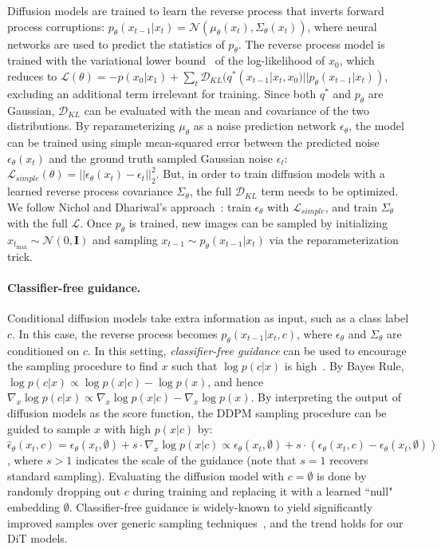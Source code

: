 \documentclass[10pt,twocolumn,letterpaper]{article}
\begin{document}
Diffusion models are trained to learn the reverse process that inverts forward process corruptions: $p_\theta(x_{t-1}|x_t) = \mathcal{N}(\mu_\theta(x_t), \Sigma_\theta(x_t))$, where neural networks are used to predict the statistics of $p_\theta$. The reverse process model is trained with the variational lower bound~\cite{kingma2013auto} of the log-likelihood of $x_0$, which reduces to $\mathcal{L}(\theta) = -p(x_0|x_1) + \sum_t \mathcal{D}_{KL}(q^*(x_{t-1}|x_{t},x_0)||p_\theta(x_{t-1}|x_t))$, excluding an additional term irrelevant for training. Since both $q^*$ and $p_\theta$ are Gaussian, $\mathcal{D}_{KL}$ can be evaluated with the mean and covariance of the two distributions. By reparameterizing $\mu_\theta$ as a noise prediction network $\epsilon_\theta$, the model can be trained using simple mean-squared error between the predicted noise $\epsilon_\theta(x_t)$ and the ground truth sampled Gaussian noise $\epsilon_t$: $\mathcal{L}_{simple}(\theta) = ||\epsilon_\theta(x_t) - \epsilon_t||_2^2$. But, in order to train diffusion models with a learned reverse process covariance $\Sigma_\theta$, the full $\mathcal{D}_{KL}$ term needs to be optimized. We follow Nichol and Dhariwal's approach~\cite{nichol2021improved}: train $\epsilon_\theta$ with $\mathcal{L}_{simple}$, and train $\Sigma_\theta$ with the full $\mathcal{L}$. Once $p_\theta$ is trained, new images can be sampled by initializing $x_{t_\text{max}} \sim \mathcal{N}(0,\mathbf{I})$ and sampling $x_{t-1} \sim p_\theta(x_{t-1}|x_t)$ via the reparameterization trick.

\paragraph{Classifier-free guidance.} Conditional diffusion models take extra information as input, such as a class label $c$. In this case, the reverse process becomes $p_\theta(x_{t-1}|x_t,c)$, where $\epsilon_\theta$ and $\Sigma_\theta$ are conditioned on $c$. In this setting, \textit{classifier-free guidance} can be used to encourage the sampling procedure to find $x$ such that $\log p(c|x)$ is high~\cite{ho2021classifier}. By Bayes Rule, $\log p(c|x) \propto \log p(x|c) - \log p(x)$, and hence $\nabla_x \log p(c|x) \propto \nabla_x \log p(x|c) - \nabla_x \log p(x)$. By interpreting the output of diffusion models as the score function, the DDPM sampling procedure can be guided to sample $x$ with high $p(x|c)$ by:
$\hat{\epsilon}_\theta(x_t, c) = \epsilon_\theta(x_t,\emptyset) + s \cdot \nabla_x \log p(x|c) \propto \epsilon_\theta(x_t, \emptyset) + s \cdot (\epsilon_\theta(x_t, c) - \epsilon_\theta(x_t, \emptyset))$, where $s > 1$ indicates the scale of the guidance (note that $s=1$ recovers standard sampling). Evaluating the diffusion model with $c=\emptyset$ is done by randomly dropping out $c$ during training and replacing it with a learned ``null" embedding $\emptyset$. Classifier-free guidance is widely-known to yield significantly improved samples over generic sampling techniques~\cite{ho2021classifier,nichol2021glide,ramesh2022hierarchical}, and the trend holds for our DiT models.
\end{document}
